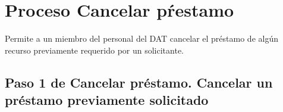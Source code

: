 \chapter{Proceso Cancelar pŕestamo}
	Permite a un miembro del personal del DAT cancelar el préstamo de
  algún recurso previamente requerido por un solicitante.


\section{Paso 1 de Cancelar préstamo.
	Cancelar un préstamo previamente solicitado}
	
	
